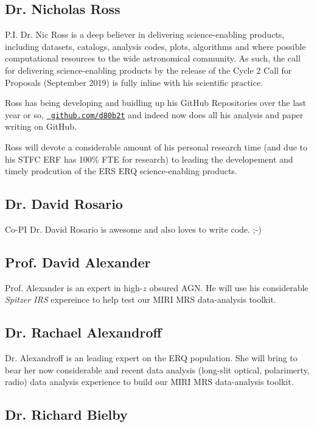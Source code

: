 \subsection{Dr. Nicholas Ross}
P.I. Dr. Nic Ross is a deep believer in delivering science-enabling
products, including datasets, catalogs, analysis codes, plots,
algorithms and where possible computational resources to the wide
astronomical community.  As such, the call for delivering
science-enabling products by the release of the Cycle 2 Call for
Proposals (September 2019) is fully inline with his scientific
practice.

\smallskip \smallskip
\noindent
Ross has being developing and buidling up his GitHub Repositories over
the last year or so, \href{https://github.com/d80b2t}{\tt
github.com/d80b2t} and indeed now does all his analysis and paper
writing on GitHub.

\smallskip \smallskip
\noindent
Ross will devote a considerable amount of his personal research time
(and due to his STFC ERF has 100\% FTE for research) to leading the
developement and timely prodcution of the ERS ERQ science-enabling
products.


\subsection{Dr. David Rosario} 
Co-PI Dr. David Rosario is awesome and also loves to write code. ;-)


\subsection{Prof. David Alexander} 
Prof. Alexander is an expert in high-$z$ obsured AGN.  He will use his
considerable {\it Spitzer IRS} expereince to help test our MIRI MRS
data-analysis toolkit.


\subsection{Dr. Rachael Alexandroff} 
Dr. Alexandroff is an leading expert on the ERQ population.  She will
bring to bear her now considerable and recent data analysis (long-slit
optical, polarimerty, radio) data analysis experience to build our
MIRI MRS data-analysis toolkit.


\subsection{Dr. Richard Bielby}

